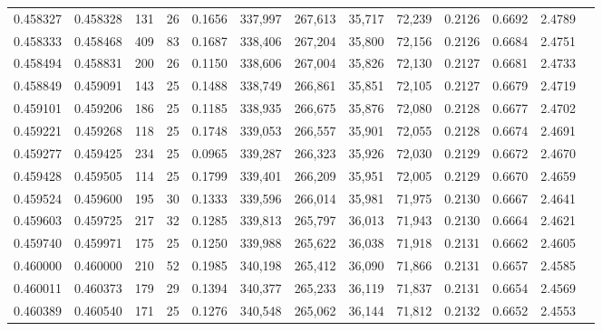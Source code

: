\begin{tabular}{rrrrrrrrrrrrr}
0.458327 & 0.458328 &    131 &    26 &                                     0.1656 & 337,997 & 267,613 &  35,717 &  72,239 & 0.2126 & 0.6692 & 2.4789 \\
0.458333 & 0.458468 &    409 &    83 &                                     0.1687 & 338,406 & 267,204 &  35,800 &  72,156 & 0.2126 & 0.6684 & 2.4751 \\
0.458494 & 0.458831 &    200 &    26 &                                     0.1150 & 338,606 & 267,004 &  35,826 &  72,130 & 0.2127 & 0.6681 & 2.4733 \\
0.458849 & 0.459091 &    143 &    25 &                                     0.1488 & 338,749 & 266,861 &  35,851 &  72,105 & 0.2127 & 0.6679 & 2.4719 \\
0.459101 & 0.459206 &    186 &    25 &                                     0.1185 & 338,935 & 266,675 &  35,876 &  72,080 & 0.2128 & 0.6677 & 2.4702 \\
0.459221 & 0.459268 &    118 &    25 &                                     0.1748 & 339,053 & 266,557 &  35,901 &  72,055 & 0.2128 & 0.6674 & 2.4691 \\
0.459277 & 0.459425 &    234 &    25 &                                     0.0965 & 339,287 & 266,323 &  35,926 &  72,030 & 0.2129 & 0.6672 & 2.4670 \\
0.459428 & 0.459505 &    114 &    25 &                                     0.1799 & 339,401 & 266,209 &  35,951 &  72,005 & 0.2129 & 0.6670 & 2.4659 \\
0.459524 & 0.459600 &    195 &    30 &                                     0.1333 & 339,596 & 266,014 &  35,981 &  71,975 & 0.2130 & 0.6667 & 2.4641 \\
0.459603 & 0.459725 &    217 &    32 &                                     0.1285 & 339,813 & 265,797 &  36,013 &  71,943 & 0.2130 & 0.6664 & 2.4621 \\
0.459740 & 0.459971 &    175 &    25 &                                     0.1250 & 339,988 & 265,622 &  36,038 &  71,918 & 0.2131 & 0.6662 & 2.4605 \\
0.460000 & 0.460000 &    210 &    52 &                                     0.1985 & 340,198 & 265,412 &  36,090 &  71,866 & 0.2131 & 0.6657 & 2.4585 \\
0.460011 & 0.460373 &    179 &    29 &                                     0.1394 & 340,377 & 265,233 &  36,119 &  71,837 & 0.2131 & 0.6654 & 2.4569 \\
0.460389 & 0.460540 &    171 &    25 &                                     0.1276 & 340,548 & 265,062 &  36,144 &  71,812 & 0.2132 & 0.6652 & 2.4553 \\

\end{tabular}
